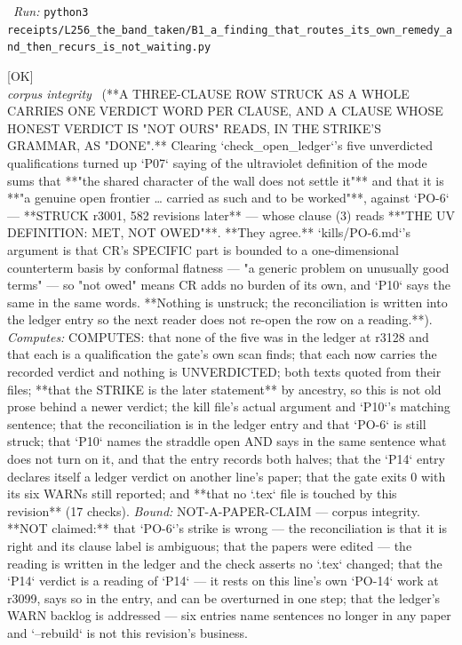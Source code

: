 \begin{description}
\ \emph{Run:} \texttt{python3 receipts/L256\_the\_band\_taken/B1\_a\_finding\_that\_routes\_its\_own\_remedy\_and\_then\_recurs\_is\_not\_waiting.py}
\item[\label{rcpt:V1_a_strike_that_reads_as_done_and_a_paper_that_says_otherwise}\texttt{V1\_a\_strike\_that\_reads\_as\_done\_and\_a\_paper\_that\_says\_otherwise}]\hfill\textsf{[OK]}\\
\textit{corpus integrity} \ (**A THREE-CLAUSE ROW STRUCK AS A WHOLE CARRIES ONE VERDICT WORD PER CLAUSE, AND A CLAUSE WHOSE HONEST VERDICT IS "NOT OURS" READS, IN THE STRIKE'S GRAMMAR, AS "DONE".** Clearing `check\_open\_ledger`'s five unverdicted qualifications turned up `P07` saying of the ultraviolet definition of the mode sums that **"the shared character of the wall does not settle it"** and that it is **"a genuine open frontier \ldots{} carried as such and to be worked"**, against `PO-6` --- **STRUCK r3001, 582 revisions later** --- whose clause (3) reads **"THE UV DEFINITION: MET, NOT OWED"**. **They agree.** `kills/PO-6.md`'s argument is that CR's SPECIFIC part is bounded to a one-dimensional counterterm basis by conformal flatness --- "a generic problem on unusually good terms" --- so "not owed" means CR adds no burden of its own, and `P10` says the same in the same words. **Nothing is unstruck; the reconciliation is written into the ledger entry so the next reader does not re-open the row on a reading.**). 
\emph{Computes:} COMPUTES: that none of the five was in the ledger at r3128 and that each is a qualification the gate's own scan finds; that each now carries the recorded verdict and nothing is UNVERDICTED; both texts quoted from their files; **that the STRIKE is the later statement** by ancestry, so this is not old prose behind a newer verdict; the kill file's actual argument and `P10`'s matching sentence; that the reconciliation is in the ledger entry and that `PO-6` is still struck; that `P10` names the straddle open AND says in the same sentence what does not turn on it, and that the entry records both halves; that the `P14` entry declares itself a ledger verdict on another line's paper; that the gate exits 0 with its six WARNs still reported; and **that no `.tex` file is touched by this revision** (17 checks).
 \emph{Bound:} NOT-A-PAPER-CLAIM --- corpus integrity. **NOT claimed:** that `PO-6`'s strike is wrong --- the reconciliation is that it is right and its clause label is ambiguous; that the papers were edited --- the reading is written in the ledger and the check asserts no `.tex` changed; that the `P14` verdict is a reading of `P14` --- it rests on this line's own `PO-14` work at r3099, says so in the entry, and can be overturned in one step; that the ledger's WARN backlog is addressed --- six entries name sentences no longer in any paper and `--rebuild` is not this revision's business.

\end{description}

